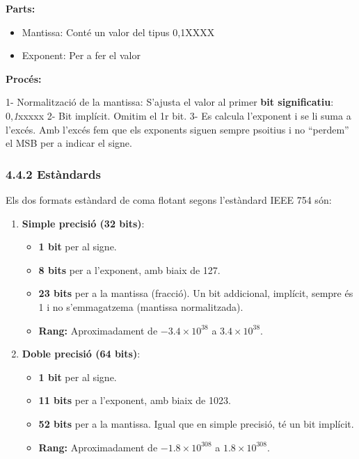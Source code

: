 \documentclass[
  12 pt,
  a4paper,
]{article}
\providecommand{\tightlist}{%
  \setlength{\itemsep}{0pt}\setlength{\parskip}{0pt}}
\begin{document}
\textbf{Parts:}

\begin{itemize}
\tightlist
\item
  Mantissa: Conté un valor del tipus 0,1XXXX
\item
  Exponent: Per a fer el valor
\end{itemize}

\textbf{Procés:}

1- Normalització de la mantissa: S'ajusta el valor al primer \textbf{bit
significatiu}: 0,\emph{1}xxxxx 2- Bit implícit. Omitim el 1r bit. 3- Es
calcula l'exponent i se li suma a l'excés. Amb l'excés fem que els
exponents siguen sempre psoitius i no ``perdem'' el MSB per a indicar el
signe.

\subsubsection{4.4.2 Estàndards}\label{estuxe0ndards}

Els dos formats estàndard de coma flotant segons l'estàndard IEEE 754
són:

\begin{enumerate}
\def\labelenumi{\arabic{enumi}.}
\tightlist
\item
  \textbf{Simple precisió (32 bits)}:

  \begin{itemize}
  \tightlist
  \item
    \textbf{1 bit} per al signe.
  \item
    \textbf{8 bits} per a l'exponent, amb biaix de 127.
  \item
    \textbf{23 bits} per a la mantissa (fracció). Un bit addicional,
    implícit, sempre és 1 i no s'emmagatzema (mantissa normalitzada).
  \item
    \textbf{Rang:} Aproximadament de \(-3.4 \times 10^{38}\) a
    \(3.4 \times 10^{38}\).
  \end{itemize}
\item
  \textbf{Doble precisió (64 bits)}:

  \begin{itemize}
  \tightlist
  \item
    \textbf{1 bit} per al signe.
  \item
    \textbf{11 bits} per a l'exponent, amb biaix de 1023.
  \item
    \textbf{52 bits} per a la mantissa. Igual que en simple precisió, té
    un bit implícit.
  \item
    \textbf{Rang:} Aproximadament de \(-1.8 \times 10^{308}\) a
    \(1.8 \times 10^{308}\).
  \end{itemize}
\end{enumerate}
\end{document}
